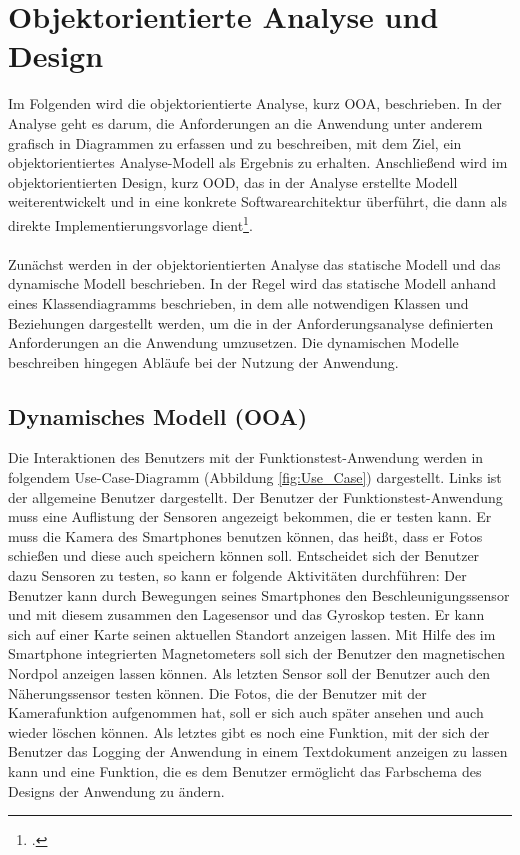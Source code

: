 \chapter{Objektorientierte Analyse und Design} \label{OOAOOD}

Im Folgenden wird die objektorientierte Analyse, kurz OOA, beschrieben. In der Analyse geht es darum, die Anforderungen an die Anwendung unter anderem grafisch in Diagrammen zu erfassen und zu beschreiben, mit dem Ziel, ein objektorientiertes Analyse-Modell als Ergebnis zu erhalten. Anschließend wird im objektorientierten Design, kurz OOD, das in der Analyse erstellte Modell weiterentwickelt und in eine konkrete Softwarearchitektur überführt, die dann als direkte Implementierungsvorlage dient\footcite{SWTBalzert}.
\\
\\
Zunächst werden in der objektorientierten Analyse das statische Modell und das dynamische Modell beschrieben. In der Regel wird das statische Modell anhand eines Klassendiagramms beschrieben, in dem alle notwendigen Klassen und Beziehungen dargestellt werden, um die in der Anforderungsanalyse definierten Anforderungen an die Anwendung umzusetzen. Die dynamischen Modelle beschreiben hingegen Abläufe bei der Nutzung der Anwendung. 

\section{Dynamisches Modell (OOA)}

Die Interaktionen des Benutzers mit der Funktionstest-Anwendung werden in folgendem Use-Case-Diagramm (Abbildung \ref{fig:Use_Case}) dargestellt. Links ist der allgemeine Benutzer dargestellt. Der Benutzer der Funktionstest-Anwendung muss eine Auflistung der Sensoren angezeigt bekommen, die er testen kann. Er muss die Kamera des Smartphones benutzen können, das heißt, dass er Fotos schießen und diese auch speichern können soll. Entscheidet sich der Benutzer dazu Sensoren zu testen, so kann er folgende Aktivitäten durchführen: Der Benutzer kann durch Bewegungen seines Smartphones den Beschleunigungssensor und mit diesem zusammen den Lagesensor und das Gyroskop testen. Er kann sich auf einer Karte seinen aktuellen Standort anzeigen lassen. Mit Hilfe des im Smartphone integrierten Magnetometers soll sich der Benutzer den magnetischen Nordpol anzeigen lassen können. Als letzten Sensor soll der Benutzer auch den Näherungssensor testen können. Die Fotos, die der Benutzer mit der Kamerafunktion aufgenommen hat, soll er sich auch später ansehen und auch wieder löschen können. Als letztes gibt es noch eine Funktion, mit der sich der Benutzer das Logging der Anwendung in einem Textdokument anzeigen zu lassen kann und eine Funktion, die es dem Benutzer ermöglicht das Farbschema des Designs der Anwendung zu ändern.  

